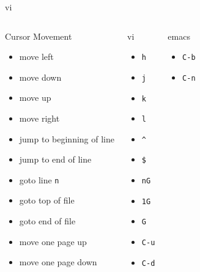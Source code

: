 \documentclass[c,compress,xcolor=svgnames]{beamer}
\newenvironment{eblock}[0]
{
\begin{beamerboxesrounded}[upper=uppercol2,lower=lowercol2,shadow=true]}
{\end{beamerboxesrounded}}
\begin{document}
\begin{frame}[allowframebreaks]
{\begin{columns}[t]
\begin{eblock}{vi}
\begin{itemize}
    \end{itemize}
    \end{eblock}
  \end{columns}
  }
  \framebreak
  \vspace{-0.6cm}
  {\scriptsize
  \begin{columns}
    \begin{eblock}{Cursor Movement}
    \begin{itemize}
      \item move left 
      \item move down
      \item move up
      \item move right
      \item jump to beginning of line
      \item jump to end of line
      \item goto line \texttt{n}
      \item goto top of file
      \item goto end of file
      \item move one page up
      \item move one page down
    \end{itemize}
    \end{eblock}
    \begin{eblock}{vi}
    \begin{itemize}
      \item \texttt{h}
      \item \texttt{j}
      \item \texttt{k}
      \item \texttt{l}
      \item \texttt{\^}
      \item \texttt{\$}
      \item \texttt{nG}
      \item \texttt{1G}
      \item \texttt{G}
      \item \texttt{C-u}
      \item \texttt{C-d}
    \end{itemize}
    \end{eblock}
    \begin{eblock}{emacs}
    \begin{itemize}
      \item \texttt{C-b}
      \item \texttt{C-n}

\end{itemize}
\end{eblock}
\end{columns}}
\end{frame}
\end{document}
